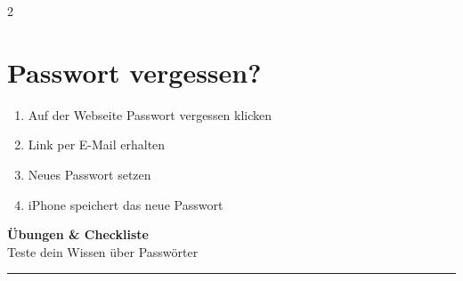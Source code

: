 \documentclass[a4paper,landscape,8pt]{extarticle}
\begin{document}
\begin{multicols}{2}
\vspace{3mm}

\begin{center}
\end{center}

\vspace{3mm}

\section*{Passwort vergessen?}

\begin{enumerate}
\item Auf der Webseite \glqq Passwort vergessen\grqq{} klicken
\item Link per E-Mail erhalten
\item Neues Passwort setzen
\item iPhone speichert das neue Passwort
\end{enumerate}

\end{multicols}

\newpage


\begin{center}
{\LARGE\bfseries Übungen \& Checkliste}\\[3pt]
{\normalsize Teste dein Wissen über Passwörter}
\end{center}

\vspace{1mm}
\hrule
\vspace{2mm}
\end{document}
